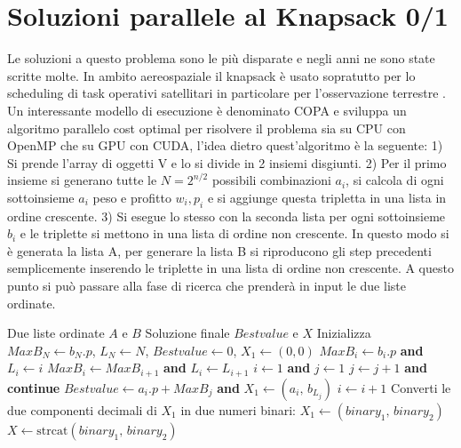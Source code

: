 \documentclass[11pt]{article}
\begin{document}
\section{Soluzioni parallele al Knapsack 0/1}

Le soluzioni a questo problema sono le più disparate e negli anni ne sono state scritte molte. In ambito aereospaziale il knapsack è usato sopratutto 
per lo scheduling di task operativi satellitari \cite{surveymethods} in particolare per l'osservazione terrestre \cite{exactmethodphoto}.
Un interessante modello di esecuzione è denominato COPA \cite{knapsackCopaSolution} e sviluppa un algoritmo parallelo cost optimal per 
risolvere il problema sia su CPU con OpenMP che su GPU con CUDA, l'idea dietro quest'algoritmo è la seguente: 1) Si prende 
l'array di oggetti V e lo si divide in 2 insiemi disgiunti. 2) Per il primo insieme si generano tutte le $N=2^{n/2}$ possibili 
combinazioni $a_i$, si calcola di ogni sottoinsieme $a_i$ peso e profitto $w_i,p_i$ e si aggiunge questa tripletta in una lista 
in ordine crescente. 3) Si esegue lo stesso con la seconda lista per ogni sottoinsieme $b_i$ e le triplette si mettono in una lista
di ordine non crescente. In questo modo si è generata la lista A, per generare la lista B si riproducono gli step precedenti 
semplicemente inserendo le triplette in una lista di ordine non crescente. A questo punto si può passare alla fase di ricerca
che prenderà in input le due liste ordinate.

\begin{algorithm}[H]
\caption{Algoritmo di ricerca}\label{alg:cap}
\begin{algorithmic}
\Require Due liste ordinate $A$ e $B$
\Ensure Soluzione finale $Bestvalue$ e $X$
\State Inizializza $MaxB_N \gets b_N.p$, $L_N \gets N$, $Bestvalue \gets 0$, $X_1 \gets (0, 0)$
        \State $MaxB_i \gets b_i.p$ \textbf{and} $L_i \gets i$
    \Else
        \State $MaxB_i \gets MaxB_{i+1}$ \textbf{and} $L_i \gets L_{i+1}$
    \EndIf
\EndFor
\State $i \gets 1$ \textbf{and} $j \gets 1$
        \State $j \gets j + 1$ \textbf{and continue}
    \EndIf
        \State $Bestvalue \gets a_i.p + MaxB_j$ \textbf{and} $X_1 \gets (a_i,\, b_{L_j})$
    \EndIf
    \State $i \gets i + 1$
\EndWhile
\State Converti le due componenti decimali di $X_1$ in due numeri binari: $X_1 \gets (binary_1,\, binary_2)$
\State $X \gets \text{strcat}(binary_1,\, binary_2)$ 
\end{algorithmic}
\end{algorithm}
\end{document}
